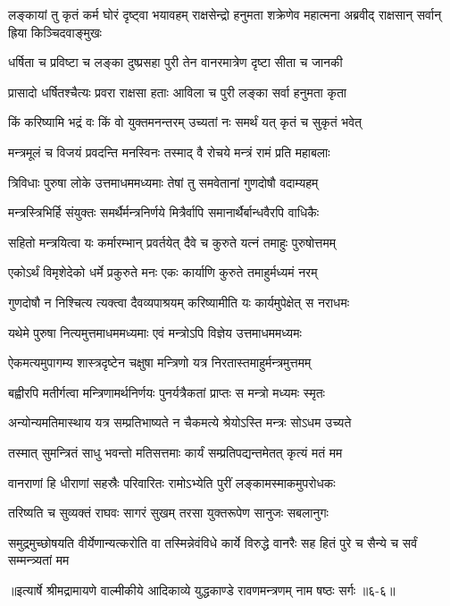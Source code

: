 
\threelineshloka
{लङ्कायां तु कृतं कर्म घोरं दृष्ट्वा भयावहम्}
{राक्षसेन्द्रो हनुमता शक्रेणेव महात्मना}
{अब्रवीद् राक्षसान् सर्वान् ह्रिया किञ्चिदवाङ्मुखः} %

\twolineshloka
{धर्षिता च प्रविष्टा च लङ्का दुष्प्रसहा पुरी}
{तेन वानरमात्रेण दृष्टा सीता च जानकी} %

\twolineshloka
{प्रासादो धर्षितश्चैत्यः प्रवरा राक्षसा हताः}
{आविला च पुरी लङ्का सर्वा हनुमता कृता} %

\twolineshloka
{किं करिष्यामि भद्रं वः किं वो युक्तमनन्तरम्}
{उच्यतां नः समर्थं यत् कृतं च सुकृतं भवेत्} %

\twolineshloka
{मन्त्रमूलं च विजयं प्रवदन्ति मनस्विनः}
{तस्माद् वै रोचये मन्त्रं रामं प्रति महाबलाः} %

\twolineshloka
{त्रिविधाः पुरुषा लोके उत्तमाधममध्यमाः}
{तेषां तु समवेतानां गुणदोषौ वदाम्यहम्} %

\twolineshloka
{मन्त्रस्त्रिभिर्हि संयुक्तः समर्थैर्मन्त्रनिर्णये}
{मित्रैर्वापि समानार्थैर्बान्धवैरपि वाधिकैः} %

\twolineshloka
{सहितो मन्त्रयित्वा यः कर्मारम्भान् प्रवर्तयेत्}
{दैवे च कुरुते यत्नं तमाहुः पुरुषोत्तमम्} %

\twolineshloka
{एकोऽर्थं विमृशेदेको धर्मे प्रकुरुते मनः}
{एकः कार्याणि कुरुते तमाहुर्मध्यमं नरम्} %

\twolineshloka
{गुणदोषौ न निश्चित्य त्यक्त्वा दैवव्यपाश्रयम्}
{करिष्यामीति यः कार्यमुपेक्षेत् स नराधमः} %

\twolineshloka
{यथेमे पुरुषा नित्यमुत्तमाधममध्यमाः}
{एवं मन्त्रोऽपि विज्ञेय उत्तमाधममध्यमः} %

\twolineshloka
{ऐकमत्यमुपागम्य शास्त्रदृष्टेन चक्षुषा}
{मन्त्रिणो यत्र निरतास्तमाहुर्मन्त्रमुत्तमम्} %

\twolineshloka
{बह्वीरपि मतीर्गत्वा मन्त्रिणामर्थनिर्णयः}
{पुनर्यत्रैकतां प्राप्तः स मन्त्रो मध्यमः स्मृतः} %

\twolineshloka
{अन्योन्यमतिमास्थाय यत्र सम्प्रतिभाष्यते}
{न चैकमत्ये श्रेयोऽस्ति मन्त्रः सोऽधम उच्यते} %

\twolineshloka
{तस्मात् सुमन्त्रितं साधु भवन्तो मतिसत्तमाः}
{कार्यं सम्प्रतिपद्यन्तमेतत् कृत्यं मतं मम} %

\twolineshloka
{वानराणां हि धीराणां सहस्रैः परिवारितः}
{रामोऽभ्येति पुरीं लङ्कामस्माकमुपरोधकः} %

\twolineshloka
{तरिष्यति च सुव्यक्तं राघवः सागरं सुखम्}
{तरसा युक्तरूपेण सानुजः सबलानुगः} %

\threelineshloka
{समुद्रमुच्छोषयति वीर्येणान्यत्करोति वा}
{तस्मिन्नेवंविधे कार्ये विरुद्धे वानरैः सह}
{हितं पुरे च सैन्ये च सर्वं सम्मन्त्र्यतां मम} %


॥इत्यार्षे श्रीमद्रामायणे वाल्मीकीये आदिकाव्ये युद्धकाण्डे रावणमन्त्रणम् नाम षष्ठः सर्गः ॥६-६॥
